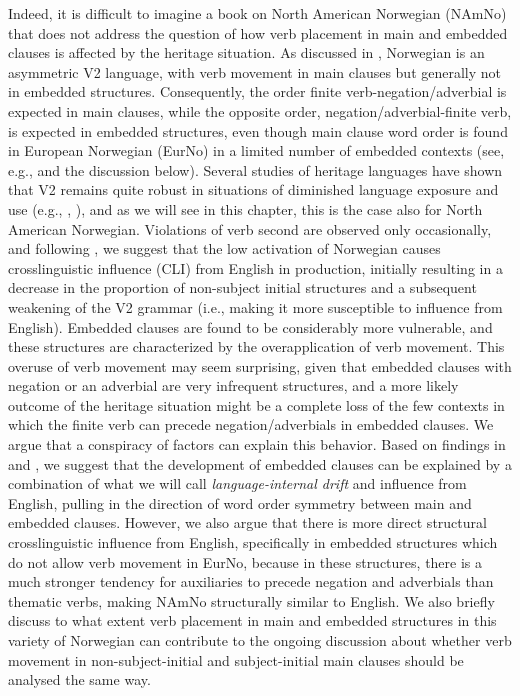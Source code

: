 \documentclass[output=paper]{langscibook}
\begin{document}
Indeed, it is difficult to imagine a book on North American Norwegian (NAmNo) that does not address the question of how verb placement in main and embedded clauses is affected by the heritage situation. As discussed in , Norwegian is an asymmetric V2 language, with verb movement in main clauses but generally not in embedded structures. Consequently, the order finite verb\hyp negation\slash adverbial is expected in main clauses, while the opposite order, negation\slash adverbial\hyp finite verb, is expected in embedded structures, even though main clause word order is found in European Norwegian (EurNo) in a limited number of embedded contexts (see, e.g., \citealt{Ringstad2019} and the discussion below). Several studies of heritage languages have shown that V2 remains quite robust in situations of diminished language exposure and use (e.g., \citealt{Håkansson1994}, \citealt{Schmid2002}), and as we will see in this chapter, this is the case also for North American Norwegian. Violations of verb second are observed only occasionally, and following \citet{WestergaardLohndalLundquist2021}, we suggest that the low activation of Norwegian causes crosslinguistic influence (CLI) from English in production, initially resulting in a decrease in the proportion of non-subject initial structures and a subsequent weakening of the V2 grammar (i.e., making it more susceptible to influence from English). Embedded clauses are found to be considerably more vulnerable, and these structures are characterized by the overapplication of verb movement. This overuse of verb movement may seem surprising, given that embedded clauses with negation or an adverbial are very infrequent structures, and a more likely outcome of the heritage situation might be a complete loss of the few contexts in which the finite verb can precede negation/adverbials in embedded clauses. We argue that a conspiracy of factors can explain this behavior. Based on findings in \citet{HoppPutnam2015} and \citet{JensbergEtAl2024}, we suggest that the development of embedded clauses can be explained by a combination of what we will call \textit{language-internal drift} and influence from English, pulling in the direction of word order symmetry between main and embedded clauses. However, we also argue that there is more direct structural crosslinguistic influence from English, specifically in embedded structures which do not allow verb movement in EurNo, because in these structures, there is a much stronger tendency for auxiliaries to precede negation and adverbials than thematic verbs, making NAmNo structurally similar to English. We also briefly discuss to what extent verb placement in main and embedded structures in this variety of Norwegian can contribute to the ongoing discussion about whether verb movement in non\hyp subject\hyp initial and subject\hyp initial main clauses should be analysed the same way.
\end{document}
